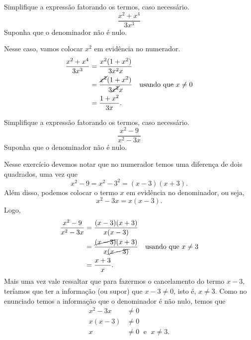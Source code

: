 \begin{example}
  Simplifique a expressão
  fatorando os termos, caso necessário.
  \[
    \frac{x^2+x^4}{3x^3}
  \]
  Suponha que o denominador não é nulo.

  \solution
  Nesse caso, vamos colocar $x^2$ em evidência no numerador.
  \begin{align*}
    \frac{x^2+x^4}{3x^3}
    & = \frac{x^2(1+x^2)}{3x^2 x} \\
    & = \frac{\cancel{x^2}(1+x^2)}{3\cancel{x^2} x} & \text{usando que } x \neq 0 \\
    & = \frac{1+x^2}{3x}.
  \end{align*}
\end{example}

\begin{example}
  Simplifique a expressão
  fatorando os termos, caso necessário.
  \[
    \frac{x^2-9}{x^2-3x}
  \]
  Suponha que o denominador não é nulo.

  \solution
  Nesse exercício devemos notar que no numerador temos uma diferença de dois
  quadrados, uma vez que
  \[
    x^2-9
    = x^2 - 3^2
    = (x-3)(x+3).
  \]
  Além disso, podemos colocar o termo $x$ em evidência no denominador,
  ou seja,
  \[
    x^2 - 3x = x(x-3).
  \]
  Logo,
  \begin{align*}
    \frac{x^2-9}{x^2-3x}
    & = \frac{(x-3)(x+3)}{x(x-3)} \\
    & = \frac{\cancel{(x-3)}(x+3)}{x\cancel{(x-3)}} & \text{usando que } x \neq 3 \\
    & = \frac{x+3}{x}.
  \end{align*}
  Mais uma vez vale ressaltar que para fazermos o cancelamento do termo $x-3$,
  teríamos que ter a informação (ou supor) que
  $x-3 \neq 0$, isto é, $x \neq 3$.
  Como no enunciado temos a informação que o denominador é não nulo,
  temos que
  \begin{align*}
    x^2 - 3x & \neq 0 \\
    x(x-3)   & \neq 0 \\
    x        & \neq 0 \;\text{ e }\; x \neq 3.
  \end{align*}
\end{example}


